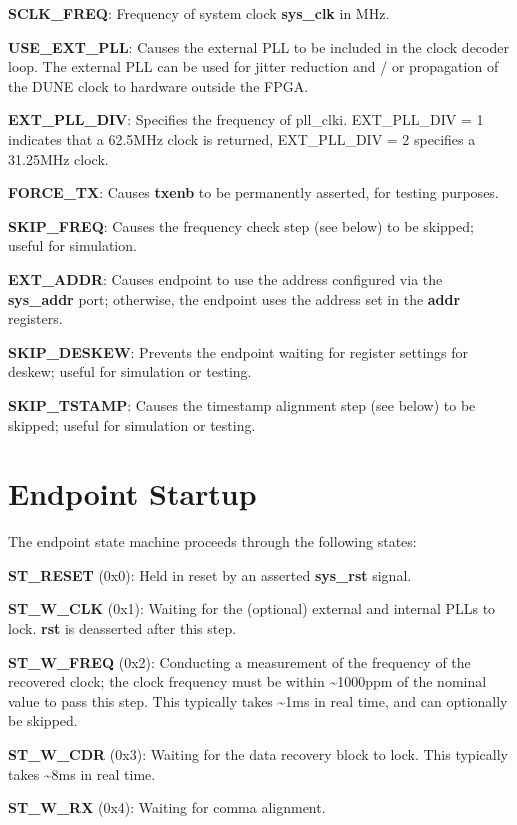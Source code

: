 \documentclass{article}
\begin{document}
\textbf{SCLK\_FREQ}: Frequency of system clock \textbf{sys\_clk} in MHz.

\textbf{USE\_EXT\_PLL}: Causes the external PLL to be included in the clock decoder loop. The external PLL can be used for jitter reduction and / or propagation of the DUNE clock to hardware outside the FPGA.

\textbf{EXT\_PLL\_DIV}: Specifies the frequency of pll\_clki. EXT\_PLL\_DIV = 1 indicates that a 62.5MHz clock is returned, EXT\_PLL\_DIV = 2 specifies a 31.25MHz clock.

\textbf{FORCE\_TX}: Causes \textbf{txenb} to be permanently asserted, for testing purposes.

\textbf{SKIP\_FREQ}: Causes the frequency check step (see below) to be skipped; useful for simulation.

\textbf{EXT\_ADDR}: Causes endpoint to use the address configured via the \textbf{sys\_addr} port; otherwise, the endpoint uses the address set in the \textbf{addr} registers.

\textbf{SKIP\_DESKEW}: Prevents the endpoint waiting for register settings for deskew; useful for simulation or testing.

\textbf{SKIP\_TSTAMP}: Causes the timestamp alignment step (see below) to be skipped; useful for simulation or testing.

\section{Endpoint Startup}

The endpoint state machine proceeds through the following states:


\textbf{ST\_RESET} (0x0): Held in reset by an asserted \textbf{sys\_rst} signal.

\textbf{ST\_W\_CLK} (0x1): Waiting for the (optional) external and internal PLLs to lock. \textbf{rst} is deasserted after this step.

\textbf{ST\_W\_FREQ} (0x2): Conducting a measurement of the frequency of the recovered clock; the clock frequency must be within \textasciitilde{}1000ppm of the nominal value to pass this step. This typically takes \textasciitilde{}1ms in real time, and can optionally be skipped.

\textbf{ST\_W\_CDR} (0x3): Waiting for the data recovery block to lock. This typically takes \textasciitilde{}8ms in real time.

\textbf{ST\_W\_RX} (0x4): Waiting for comma alignment.
\end{document}
